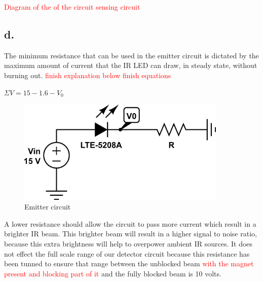 \documentclass{article}
\newcommand{\xxx}[1]{\textcolor{red}{#1}}
\theoremstyle{plain}
\theoremstyle{definition}
\theoremstyle{remark}
\begin{document}
\xxx{Diagram of the of the circuit sensing circuit}\\

\subsection*{d.}
The minimum resistance that can be used in the emitter circuit is dictated by the maximum amount of current that the IR LED can draw, in steady state, without burning out.  \xxx{finish explanation below}
\xxx{finish equations}
\begin{center}
$ \Sigma{V} = 15 - 1.6 - V_0 $
\end{center}

\begin{figure}[hbt]
\begin{center}
\includegraphics[width = 10cm]{lab2_emitter.png}
\end{center}
\caption{Emitter circuit}
\label{q1_df1}
\end{figure}
A lower resistance should allow the circuit to pass more current which result in a brighter IR beam. This brighter beam will result in a higher signal to noise ratio, because this extra brightness will help to overpower ambient IR sources. It does not effect the full scale range of our detector circuit because this resistance has been tunned to ensure that range between the unblocked beam \xxx{with the magnet present and blocking part of it} and the fully blocked beam is 10 volts. \\  
\end{document}
